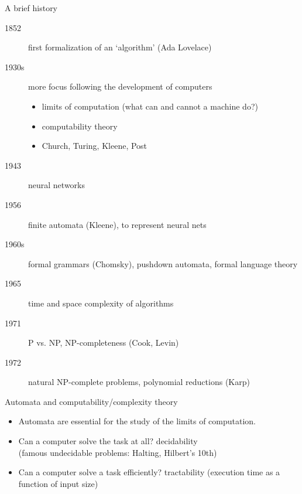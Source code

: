\documentclass[handout]{beamer}
\begin{document}
\begin{frame}{A brief history}

    \begin{description}
        \item[1852\phantom{s}]first formalization of an `algorithm' (Ada Lovelace)
        \item[1930s] more focus following the development of computers 
        \begin{itemize}
            \item limits of computation (what can and cannot a machine do?)
            \item computability theory
            \item Church, Turing, Kleene, Post
        \end{itemize}
        \item[1943\phantom{s}] neural networks
        \item[1956\phantom{s}] finite \alert{automata} (Kleene), to represent neural nets
        \item[1960s] formal \alert{grammars} (Chomsky), pushdown automata, formal language theory
        \item[1965\phantom{s}] time and space complexity of algorithms
        \item[1971\phantom{s}] P vs. NP, NP-completeness (Cook, Levin)
        \item[1972\phantom{s}] natural NP-complete problems, polynomial reductions (Karp)
    \end{description}

\end{frame}


\begin{frame}{Automata and computability/complexity theory}

    \begin{itemize}
        \item Automata are essential for the study of the limits of computation.
        \item Can a computer solve the task at all? \alert{decidability} \\(famous undecidable problems: Halting, Hilbert’s 10th)
        \item Can a computer solve a task efficiently? \alert{tractability} (execution time as a function of input size)
    \end{itemize}

\end{frame}
\end{document}
